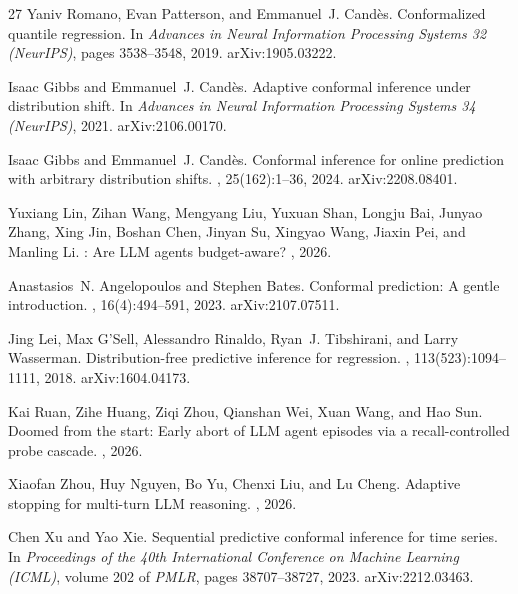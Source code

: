 \documentclass{article}
\begin{document}
\begin{thebibliography}{27}
Yaniv Romano, Evan Patterson, and Emmanuel~J. Cand{\`e}s.
\newblock Conformalized quantile regression.
\newblock In {\em Advances in Neural Information Processing Systems 32 (NeurIPS)},
  pages 3538--3548, 2019. arXiv:1905.03222.

Isaac Gibbs and Emmanuel~J. Cand{\`e}s.
\newblock Adaptive conformal inference under distribution shift.
\newblock In {\em Advances in Neural Information Processing Systems 34 (NeurIPS)},
  2021. arXiv:2106.00170.

Isaac Gibbs and Emmanuel~J. Cand{\`e}s.
\newblock Conformal inference for online prediction with arbitrary distribution
  shifts.
, 25(162):1--36, 2024.
  arXiv:2208.08401.

Yuxiang Lin, Zihan Wang, Mengyang Liu, Yuxuan Shan, Longju Bai, Junyao Zhang, Xing
  Jin, Boshan Chen, Jinyan Su, Xingyao Wang, Jiaxin Pei, and Manling Li.
: Are {LLM} agents budget-aware?
, 2026.

Anastasios~N. Angelopoulos and Stephen Bates.
\newblock Conformal prediction: A gentle introduction.
, 16(4):494--591, 2023.
  arXiv:2107.07511.

Jing Lei, Max G'Sell, Alessandro Rinaldo, Ryan~J. Tibshirani, and Larry Wasserman.
\newblock Distribution-free predictive inference for regression.
, 113(523):1094--1111,
  2018. arXiv:1604.04173.

Kai Ruan, Zihe Huang, Ziqi Zhou, Qianshan Wei, Xuan Wang, and Hao Sun.
\newblock Doomed from the start: Early abort of {LLM} agent episodes via a
  recall-controlled probe cascade.
, 2026.

Xiaofan Zhou, Huy Nguyen, Bo Yu, Chenxi Liu, and Lu Cheng.
\newblock Adaptive stopping for multi-turn {LLM} reasoning.
, 2026.

Chen Xu and Yao Xie.
\newblock Sequential predictive conformal inference for time series.
\newblock In {\em Proceedings of the 40th International Conference on Machine Learning
  (ICML)}, volume 202 of {\em PMLR}, pages 38707--38727, 2023. arXiv:2212.03463.


\end{thebibliography}
\end{document}
